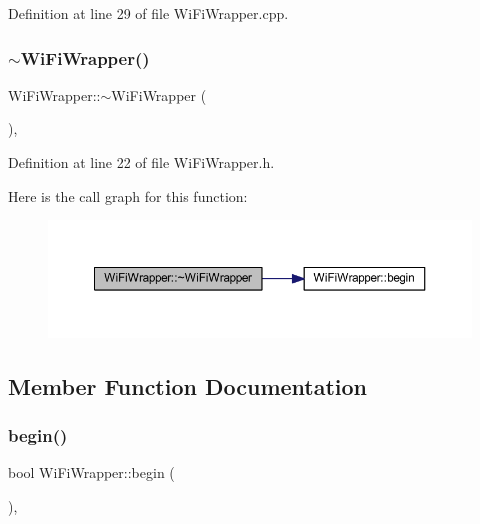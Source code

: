 Definition at line 29 of file Wi\+Fi\+Wrapper.\+cpp.

\mbox{\label{class_wi_fi_wrapper_a4c6dbcd78612070abf2b9a7fa5efb92c}} 
\subsubsection{\texorpdfstring{$\sim$\+Wi\+Fi\+Wrapper()}{~WiFiWrapper()}}
{\footnotesize\ttfamily Wi\+Fi\+Wrapper\+::$\sim$\+Wi\+Fi\+Wrapper (\begin{DoxyParamCaption}{ }\end{DoxyParamCaption})\hspace{0.3cm}{\ttfamily [inline]}, {\ttfamily [override]}}



Definition at line 22 of file Wi\+Fi\+Wrapper.\+h.

Here is the call graph for this function\+:\nopagebreak
\begin{figure}[H]
\begin{center}
\leavevmode
\includegraphics[width=350pt]{class_wi_fi_wrapper_a4c6dbcd78612070abf2b9a7fa5efb92c_cgraph}
\end{center}
\end{figure}


\subsection{Member Function Documentation}
\mbox{\label{class_wi_fi_wrapper_a6d2ace1968e0f9b04f690e66679dae0c}} 
\subsubsection{\texorpdfstring{begin()}{begin()}}
{\footnotesize\ttfamily bool Wi\+Fi\+Wrapper\+::begin (\begin{DoxyParamCaption}{ }\end{DoxyParamCaption})\hspace{0.3cm}{\ttfamily [override]}, {\ttfamily [virtual]}}



